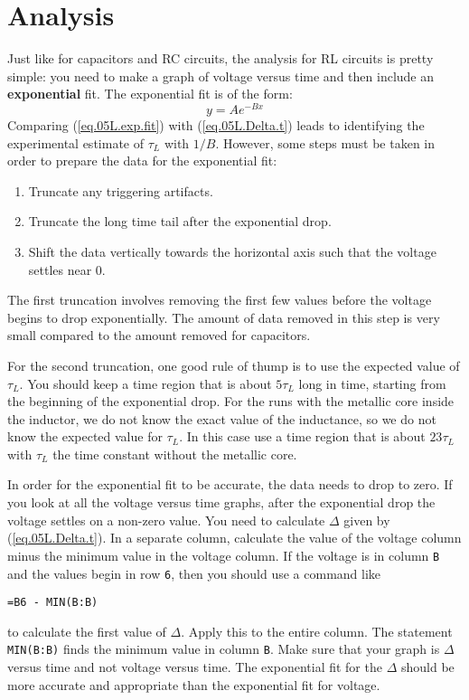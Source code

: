 \section{Analysis}
%
Just like for capacitors and RC circuits, the analysis for RL circuits is pretty simple: you need to make a graph of voltage versus time and then include an \textbf{exponential} fit. The exponential fit is of the form:
\begin{equation}
	y = A e^{-Bx}
	\label{eq.05L.exp.fit}
\end{equation}
Comparing (\ref{eq.05L.exp.fit}) with (\ref{eq.05L.Delta.t}) leads to identifying the experimental estimate of $\tau_{L}$ with $1 / B$.
\newpage
However, some steps must be taken in order to prepare the data for the exponential fit:
\begin{enumerate}
	\item Truncate any triggering artifacts.
	\item Truncate the long time tail after the exponential drop.
	\item Shift the data vertically towards the horizontal axis such that the voltage settles near 0.
\end{enumerate}
The first truncation involves removing the first few values before the voltage begins to drop exponentially. The amount of data removed in this step is very small compared to the amount removed for capacitors.

For the second truncation, one good rule of thump is to use the expected value of $\tau_{L}$. You should keep a time region that is about $5\tau_{L}$ long in time, starting from the beginning of the exponential drop. For the runs with the metallic core inside the inductor, we do not know the exact value of the inductance, so we do not know the expected value for $\tau_{L}$. In this case use a time region that is about $23\tau_{L}$ with $\tau_{L}$ the time constant without the metallic core.

In order for the exponential fit to be accurate, the data needs to drop to zero. If you look at all the voltage versus time graphs, after the exponential drop the voltage settles on a non-zero value. You need to calculate $\Delta$ given by (\ref{eq.05L.Delta.t}). In a separate column, calculate the value of the voltage column minus the minimum value in the voltage column. If the voltage is in column \texttt{B} and the values begin in row \texttt{6}, then you should use a command like
\begin{center}
	\texttt{=B6 - MIN(B:B)}
\end{center}
to calculate the first value of $\Delta$. Apply this to the entire column. The statement \texttt{MIN(B:B)} finds the minimum value in column \texttt{B}. Make sure that your graph is $\Delta$ versus time and not voltage versus time. The exponential fit for the $\Delta$ should be more accurate and appropriate than the exponential fit for voltage.
%
